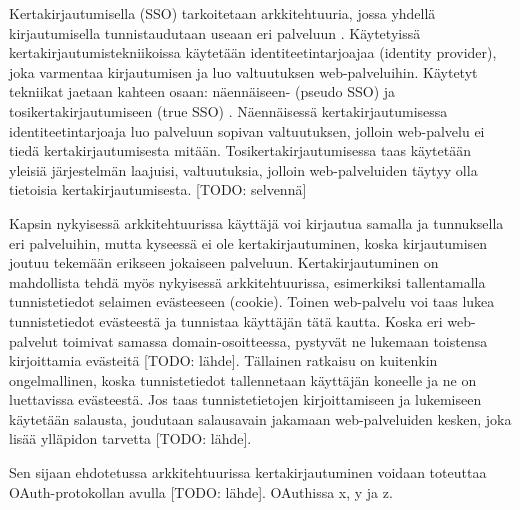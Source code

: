 Kertakirjautumisella (SSO) tarkoitetaan arkkitehtuuria, jossa yhdellä kirjautumisella tunnistaudutaan useaan eri palveluun \cite{sso}. Käytetyissä kertakirjautumistekniikoissa käytetään identiteetintarjoajaa (identity provider), joka varmentaa kirjautumisen ja luo valtuutuksen web-palveluihin. Käytetyt tekniikat jaetaan kahteen osaan: näennäiseen- (pseudo SSO) ja tosikertakirjautumiseen (true SSO) \cite{sso}. Näennäisessä kertakirjautumisessa identiteetintarjoaja luo palveluun sopivan valtuutuksen, jolloin web-palvelu ei tiedä kertakirjautumisesta mitään. Tosikertakirjautumisessa taas käytetään yleisiä järjestelmän laajuisi, valtuutuksia, jolloin web-palveluiden täytyy olla tietoisia kertakirjautumisesta. [TODO: selvennä]

Kapsin nykyisessä arkkitehtuurissa käyttäjä voi kirjautua samalla ja tunnuksella eri palveluihin, mutta kyseessä ei ole kertakirjautuminen, koska kirjautumisen joutuu tekemään erikseen jokaiseen palveluun. Kertakirjautuminen on mahdollista tehdä myös nykyisessä arkkitehtuurissa, esimerkiksi tallentamalla tunnistetiedot selaimen evästeeseen (cookie). Toinen web-palvelu voi taas lukea tunnistetiedot evästeestä ja tunnistaa käyttäjän tätä kautta. Koska eri web-palvelut toimivat samassa domain-osoitteessa, pystyvät ne lukemaan toistensa kirjoittamia evästeitä [TODO: lähde]. Tällainen ratkaisu on kuitenkin ongelmallinen, koska tunnistetiedot tallennetaan käyttäjän koneelle ja ne on luettavissa evästeestä. Jos taas tunnistetietojen kirjoittamiseen ja lukemiseen käytetään salausta, joudutaan salausavain jakamaan web-palveluiden kesken, joka lisää ylläpidon tarvetta [TODO: lähde].

Sen sijaan ehdotetussa arkkitehtuurissa kertakirjautuminen voidaan toteuttaa OAuth-protokollan avulla [TODO: lähde]. OAuthissa x, y ja z.